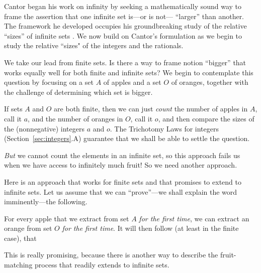 Cantor began his work on infinity by seeking a mathematically sound way to frame the assertion that one infinite set is---or is not--- ``larger'' than another.  The framework he developed occupies his groundbreaking study of the relative ``sizes'' of infinite sets \cite{Cantor74,Cantor78}.  We now build on Cantor's formulation as we begin to study the relative ``sizes" of the integers and the rationals.

\medskip

We take our lead from finite sets.  Is there a way to frame notion ``bigger'' that works equally well for both finite and infinite sets?  We begin to contemplate this question by focusing on a set $A$ of apples and a set $O$ of oranges, together with the challenge of determining which set is bigger.

\medskip

If sets $A$ and $O$ are both finite, then we can just {\em count} the number of apples in $A$, call it $a$, and the number of oranges in $O$, call it $o$, and then compare the sizes of the (nonnegative) integers $a$ and $o$.  The Trichotomy Laws for integers (Section~\ref{sec:integers}.A) guarantee that we shall be able to settle the question.

\smallskip

\noindent
{\em But} we cannot count the elements in an infinite set, so this approach fails us when we have access to infinitely much fruit!  So we need another approach.

\medskip

Here is an approach that works for finite sets and that promises to extend to infinite sets.  Let us assume that we can ``prove''---we shall explain the word imminently---the following.

For every apple that we extract from set $A$ {\em for the first time}, we can extract an orange from set $O$ {\em for the first time}.  It will then follow (at least in the finite case), that \\
\hspace*{.35in}{\em There are at least as many oranges as apples!}

\medskip

\noindent
This is really promising, because there is another way to describe the fruit-matching process that readily extends to infinite sets. \\


